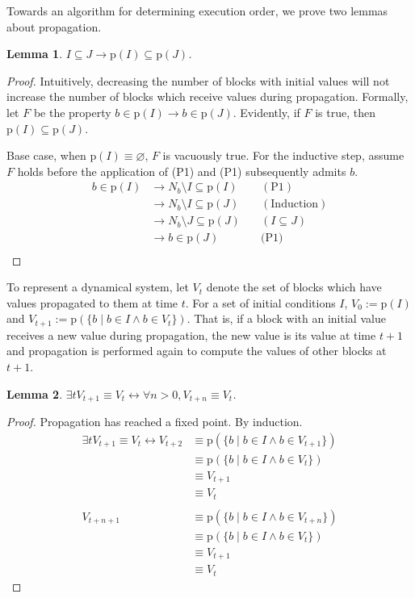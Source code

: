 \documentclass[twocolumn]{article}
\newtheorem{lemma}{Lemma}
\newcommand*{\Inputs}[1]{N_{#1}}
\begin{document}
Towards an algorithm for determining execution order, we prove two lemmas about propagation.

\begin{lemma}\label{lem:subset}
$I\subseteq J \rightarrow \text{p}(I)\subseteq\text{p}(J)$.
\end{lemma}
\begin{proof}
    Intuitively, decreasing the number of blocks with initial values will not increase the number of blocks which receive values during propagation. Formally, let $F$ be the property $b\in \text{p}(I)\rightarrow b\in\text{p}(J)$. Evidently, if $F$ is true, then $\text{p}(I)\subseteq\text{p}(J)$.
    
    Base case, when $\text{p}(I)\equiv\varnothing$, $F$ is vacuously true. For the inductive step, assume $F$ holds before the application of (P1) and (P1) subsequently admits $b$.
\begin{align*}
    b \in \text{p}(I) &\rightarrow \Inputs{b} \setminus I \subseteq \text{p}(I)\quad &(\text{P1})\\
    &\rightarrow \Inputs{b} \setminus I \subseteq \text{p}(J) \quad &(\text{Induction}) \\
    &\rightarrow \Inputs{b} \setminus J \subseteq \text{p}(J) \quad &(I \subseteq J) \\
    &\rightarrow b\in\text{p}(J)\quad &\text{(P1)} \\
\end{align*}
\end{proof}

To represent a dynamical system, let $V_t$ denote the set of blocks which have values propagated to them at time $t$. For a set of initial conditions $I$, $V_0 := \text{p}(I)$ and $V_{t+1} := \text{p}(\{b\mid b\in I \land b\in V_t\})$. That is, if a block with an initial value receives a new value during propagation, the new value is its value at time $t+1$ and propagation is performed again to compute the values of other blocks at $t+1$.

\begin{lemma}\label{lem:fixedpoint}
    $\exists t V_{t+1}\equiv V_t \leftrightarrow \forall n>0, V_{t+n}\equiv V_t$.
\end{lemma}
\begin{proof} Propagation has reached a fixed point. By induction.
    \[
       \begin{aligned}
           \exists t V_{t+1}\equiv V_t \leftrightarrow V_{t+2} &\equiv \text{p}(\{b\mid b\in I \land b\in V_{t+1}\}) \\
           &\equiv \text{p}(\{b\mid b\in I \land b\in V_{t}\}) \\
           &\equiv V_{t+1} \\
           &\equiv V_{t} \\ \\
           V_{t+n+1} &\equiv \text{p}(\{b\mid b\in I \land b\in V_{t+n}\}) \\
           &\equiv \text{p}(\{b\mid b\in I \land b\in V_{t}\}) \\
           &\equiv V_{t+1} \\
           &\equiv V_{t}
           \end{aligned}
    \]
\end{proof}
\end{document}
